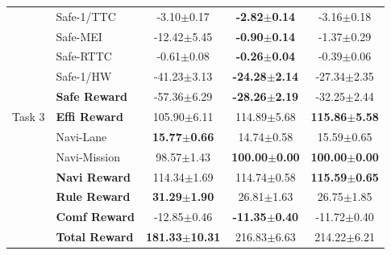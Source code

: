 {\begin{longtable}{l l c c c}
  \multirow{11}{*}{Task 3}
  & Safe-1/TTC       & -3.10$\pm$0.17 & \textbf{-2.82$\pm$0.14} & -3.16$\pm$0.18 \\
  & Safe-MEI         & -12.42$\pm$5.45 & \textbf{-0.90$\pm$0.14} & -1.37$\pm$0.29 \\
  & Safe-RTTC        & -0.61$\pm$0.08 & \textbf{-0.26$\pm$0.04} & -0.39$\pm$0.06 \\
  & Safe-1/HW        & -41.23$\pm$3.13 & \textbf{-24.28$\pm$2.14} & -27.34$\pm$2.35 \\
  & \textbf{Safe Reward} & -57.36$\pm$6.29 & \textbf{-28.26$\pm$2.19} & -32.25$\pm$2.44 \\
  & \textbf{Effi Reward} & 105.90$\pm$6.11 & 114.89$\pm$5.68 & \textbf{115.86$\pm$5.58} \\
  & Navi-Lane        & \textbf{15.77$\pm$0.66} & 14.74$\pm$0.58 & 15.59$\pm$0.65 \\
  & Navi-Mission     & 98.57$\pm$1.43 & \textbf{100.00$\pm$0.00} & \textbf{100.00$\pm$0.00} \\
  & \textbf{Navi Reward} & 114.34$\pm$1.69 & 114.74$\pm$0.58 & \textbf{115.59$\pm$0.65} \\
  & \textbf{Rule Reward} & \textbf{31.29$\pm$1.90} & 26.81$\pm$1.63 & 26.75$\pm$1.85 \\
  & \textbf{Comf Reward} & -12.85$\pm$0.46 & \textbf{-11.35$\pm$0.40} & -11.72$\pm$0.40 \\
  & \textbf{Total Reward} & \textbf{181.33$\pm$10.31} & 216.83$\pm$6.63 & 214.22$\pm$6.21 \\
  \midrule


\end{longtable}}
